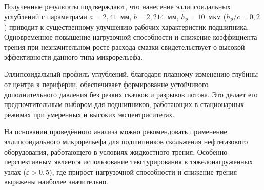 Полученные результаты подтверждают, что нанесение эллипсоидальных углублений с параметрами $a = 2{,}41$~мм, $b = 2{,}214$~мм, $h_p = 10$~мкм ($h_p/c = 0{,}2$) приводит к существенному улучшению рабочих характеристик подшипника. Одновременное повышение нагрузочной способности и снижение коэффициента трения при незначительном росте расхода смазки свидетельствует о высокой эффективности данного типа микрорельефа.

Эллипсоидальный профиль углублений, благодаря плавному изменению глубины от центра к периферии, обеспечивает формирование устойчивого дополнительного давления без резких скачков и разрывов потока. Это делает его предпочтительным выбором для подшипников, работающих в стационарных режимах при умеренных и высоких эксцентриситетах.

На основании проведённого анализа можно рекомендовать применение эллипсоидального микрорельефа для подшипников скольжения нефтегазового оборудования, работающего в условиях жидкостного трения. Особенно перспективным является использование текстурирования в тяжелонагруженных узлах ($\varepsilon > 0{,}5$), где прирост нагрузочной способности и снижение трения выражены наиболее значительно.

